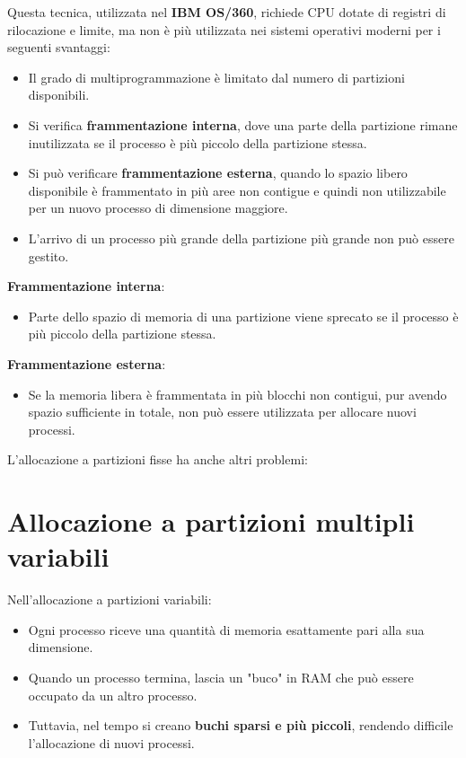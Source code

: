 Questa tecnica, utilizzata nel \textbf{IBM OS/360}, richiede CPU dotate di registri di rilocazione e limite, ma non è più utilizzata nei sistemi operativi moderni per i seguenti svantaggi:
\begin{itemize}
    \item Il grado di multiprogrammazione è limitato dal numero di partizioni disponibili.
    \item Si verifica \textbf{frammentazione interna}, dove una parte della partizione rimane inutilizzata se il processo è più piccolo della partizione stessa.
    \item Si può verificare \textbf{frammentazione esterna}, quando lo spazio libero disponibile è frammentato in più aree non contigue e quindi non utilizzabile per un nuovo processo di dimensione maggiore.
    \item L'arrivo di un processo più grande della partizione più grande non può essere gestito.
\end{itemize}

\textbf{Frammentazione interna}:
\begin{itemize}
    \item Parte dello spazio di memoria di una partizione viene sprecato se il processo è più piccolo della partizione stessa.
\end{itemize}

\textbf{Frammentazione esterna}:
\begin{itemize}
    \item Se la memoria libera è frammentata in più blocchi non contigui, pur avendo spazio sufficiente in totale, non può essere utilizzata per allocare nuovi processi.
\end{itemize}

L’allocazione a partizioni fisse ha anche altri problemi:

\section{Allocazione a partizioni multipli variabili}
Nell'allocazione a partizioni variabili:
\begin{itemize}
    \item Ogni processo riceve una quantità di memoria esattamente pari alla sua dimensione.
    \item Quando un processo termina, lascia un "buco" in RAM che può essere occupato da un altro processo.
    \item Tuttavia, nel tempo si creano \textbf{buchi sparsi e più piccoli}, rendendo difficile l'allocazione di nuovi processi.
\end{itemize}

